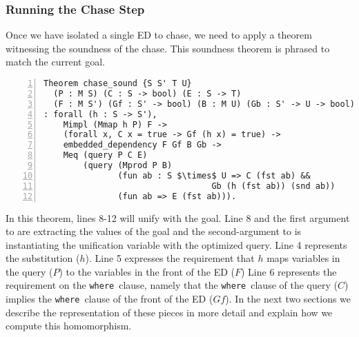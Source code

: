 \documentclass[preprint]{sigplanconf}
\newcommand{\WHERE}{{\tt where}\relax\ifmmode\ \else\xspace\fi}
\begin{document}

\subsubsection{Running the Chase Step}
\label{sec:chase-step}

Once we have isolated a single ED to chase, we need to apply a theorem witnessing the soundness of the chase.
This soundness theorem is phrased to match the current goal.
\begin{lstlisting}[numbers=left]
Theorem chase_sound {S S' T U}
  (P : M S) (C : S -> bool) (E : S -> T)
  (F : M S') (Gf : S' -> bool) (B : M U) (Gb : S' -> U -> bool)
: forall (h : S -> S'),
    Mimpl (Mmap h P) F ->
    (forall x, C x = true -> Gf (h x) = true) ->
    embedded_dependency F Gf B Gb ->
    Meq (query P C E)
        (query (Mprod P B)
               (fun ab : S $\times$ U => C (fst ab) &&
                                  Gb (h (fst ab)) (snd ab))
               (fun ab => E (fst ab))).
\end{lstlisting}
In this theorem, lines 8-12 will unify with the goal.
Line 8 and the first argument to  are extracting the values of the goal and the second-argument to  is instantiating the unification variable with the optimized query.
Line 4 represents the substitution ($h$).
Line 5 expresses the requirement that $h$ maps variables in the query ($P$) to the variables in the front of the ED ($F$)
Line 6 represents the requirement on the \WHERE clause, namely that the \WHERE clause of the query ($C$) implies the \WHERE clause of the front of the ED ($Gf$).
In the next two sections we describe the representation of these pieces in more detail and explain how we compute this homomorphism.
\end{document}
